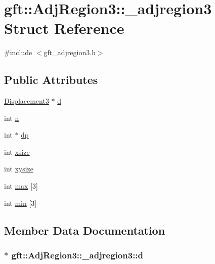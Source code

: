 \hypertarget{structgft_1_1AdjRegion3_1_1__adjregion3}{}\section{gft\+:\+:Adj\+Region3\+:\+:\+\_\+adjregion3 Struct Reference}
\label{structgft_1_1AdjRegion3_1_1__adjregion3}


{\ttfamily \#include $<$gft\+\_\+adjregion3.\+h$>$}

\subsection*{Public Attributes}
\begin{DoxyCompactItemize}
\item 
\hyperlink{namespacegft_1_1AdjRegion3_a36e3b3c33b2dfaebe493f4abf791ee4c}{Displacement3} $\ast$ \hyperlink{structgft_1_1AdjRegion3_1_1__adjregion3_a61e32356b37a8beb8e6778c65d1c1917}{d}
\item 
int \hyperlink{structgft_1_1AdjRegion3_1_1__adjregion3_abc20e7d7d2e211de9a4e467854c5e18d}{n}
\item 
int $\ast$ \hyperlink{structgft_1_1AdjRegion3_1_1__adjregion3_afbd629a76c623592162cf237aa3c077b}{dp}
\item 
int \hyperlink{structgft_1_1AdjRegion3_1_1__adjregion3_a4037356e2aa308226792442cbc1f7754}{xsize}
\item 
int \hyperlink{structgft_1_1AdjRegion3_1_1__adjregion3_ad70bcfe7793b3d3468b3360339f1a1ff}{xysize}
\item 
int \hyperlink{structgft_1_1AdjRegion3_1_1__adjregion3_a2713b02ce47368ef66ca13028e1b15d1}{max} \mbox{[}3\mbox{]}
\item 
int \hyperlink{structgft_1_1AdjRegion3_1_1__adjregion3_a4f8a9dd3f56f3f5d5fb3d26d45edf782}{min} \mbox{[}3\mbox{]}
\end{DoxyCompactItemize}


\subsection{Member Data Documentation}
\subsubsection[{\texorpdfstring{d}{d}}]{$\ast$ gft\+::\+Adj\+Region3\+::\+\_\+adjregion3\+::d}\hypertarget{structgft_1_1AdjRegion3_1_1__adjregion3_a61e32356b37a8beb8e6778c65d1c1917}{}\label{structgft_1_1AdjRegion3_1_1__adjregion3_a61e32356b37a8beb8e6778c65d1c1917}
